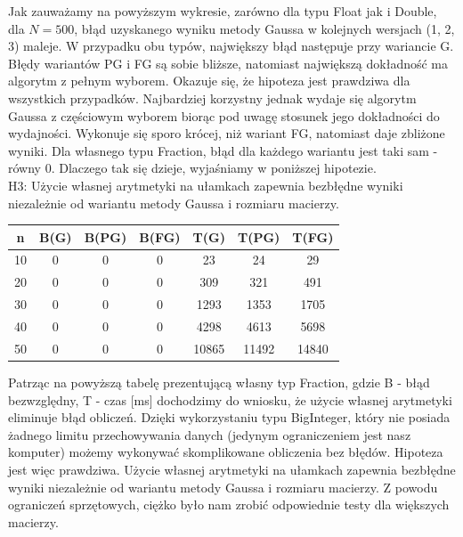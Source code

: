 \documentclass[11pt]{article}
\begin{document}
Jak zauważamy na powyższym wykresie, zarówno dla typu Float jak i Double, dla $N = 500$, błąd uzyskanego wyniku metody Gaussa w kolejnych wersjach (1, 2, 3) maleje. W przypadku obu typów, największy błąd następuje przy wariancie G. Błędy wariantów PG i FG są sobie bliższe, natomiast największą dokładność ma algorytm z pełnym wyborem. Okazuje się, że hipoteza jest prawdziwa dla wszystkich przypadków. Najbardziej korzystny jednak wydaje się algorytm Gaussa z częściowym wyborem biorąc pod uwagę stosunek jego dokładności do wydajności. Wykonuje się sporo krócej, niż wariant FG, natomiast daje zbliżone wyniki. Dla własnego typu Fraction, błąd dla każdego wariantu jest taki sam - równy $0$. Dlaczego tak się dzieje, wyjaśniamy w poniższej hipotezie.
\\[1\baselineskip]
H3: Użycie własnej arytmetyki na ułamkach zapewnia bezbłędne wyniki niezależnie od
wariantu metody Gaussa i rozmiaru macierzy.
\begin{center}
 \begin{tabular}{|c | c| c | c|c|c|c|} 
 \hline
 n & B(G) & B(PG) & B(FG) & T(G) & T(PG) & T(FG)  \\ 
 \hline\hline
 10 & 0 & 0 & 0 & 23 & 24 & 29 \\ 
 \hline
 20 & 0 & 0 & 0 & 309 & 321 & 491 \\
 \hline
 30 & 0 & 0 & 0 & 1293 & 1353 & 1705 \\
 \hline
 40 & 0 & 0 & 0 & 4298 & 4613 & 5698 \\
 \hline
 50 & 0 & 0 & 0 & 10865 & 11492 & 14840 \\ 
 \hline
\end{tabular}
\end{center}
Patrząc na powyższą tabelę prezentującą własny typ Fraction, gdzie B - błąd bezwzględny, T - czas [ms] dochodzimy do wniosku, że użycie własnej arytmetyki eliminuje błąd obliczeń. Dzięki wykorzystaniu typu BigInteger, który nie posiada żadnego limitu przechowywania danych (jedynym ograniczeniem jest nasz komputer) możemy wykonywać skomplikowane obliczenia bez błędów. Hipoteza jest więc prawdziwa. Użycie własnej arytmetyki na ułamkach zapewnia bezbłędne wyniki niezależnie od wariantu metody Gaussa i rozmiaru macierzy. Z powodu ograniczeń sprzętowych, ciężko było nam zrobić odpowiednie testy dla większych macierzy.
\end{document}
